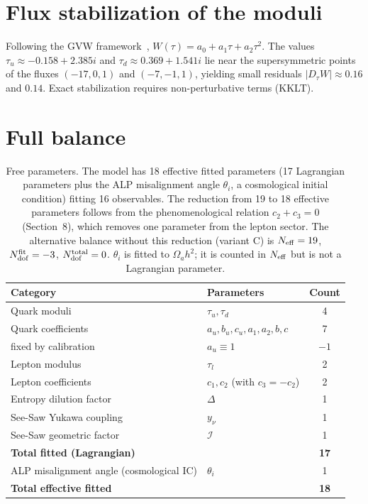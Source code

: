 \documentclass[12pt,a4paper]{article}
\numberwithin{equation}{section}
\begin{document}
\section{Flux stabilization of the moduli}
Following the GVW framework~\cite{GVW2000}, \(W(\tau) = a_0 + a_1 \tau + a_2 \tau^2\). The values \(\tau_u \approx -0.158 + 2.385i\) and \(\tau_d \approx 0.369 + 1.541i\) lie near the supersymmetric points of the fluxes \((-17, 0, 1)\) and \((-7, -1, 1)\), yielding small residuals \(|D_\tau W| \approx 0.16\) and \(0.14\). Exact stabilization requires non-perturbative terms (KKLT).

\section{Full balance}
\begin{table}[H]
\centering
\caption{Free parameters. The model has 18 effective fitted parameters (17 Lagrangian parameters plus the ALP misalignment angle \(\theta_i\), a cosmological initial condition) fitting 16 observables. The reduction from 19 to 18 effective parameters follows from the phenomenological relation \(c_2 + c_3 = 0\) (Section~8), which removes one parameter from the lepton sector. The alternative balance without this reduction (variant C) is \(N_{\rm eff} = 19\), \(N_{\rm dof}^{\rm fit} = -3\), \(N_{\rm dof}^{\rm total} = 0\). \(\theta_i\) is fitted to \(\Omega_a h^2\); it is counted in \(N_{\rm eff}\) but is not a Lagrangian parameter.}
\begin{tabular}{llc}
\toprule
Category & Parameters & Count \\
\midrule
Quark moduli & \(\tau_u, \tau_d\) & 4 \\
Quark coefficients & \(a_u, b_u, c_u, a_1, a_2, b, c\) & 7 \\
\quad fixed by calibration & \(a_u \equiv 1\) & \(-1\) \\
Lepton modulus & \(\tau_l\) & 2 \\
Lepton coefficients & \(c_1, c_2\) (with \(c_3 = -c_2\)) & 2 \\
Entropy dilution factor & \(\Delta\) & 1 \\
See-Saw Yukawa coupling & \(y_\nu\) & 1 \\
See-Saw geometric factor & \(\mathcal{I}\) & 1 \\
\midrule
\textbf{Total fitted (Lagrangian)} & & \textbf{17} \\
\midrule
ALP misalignment angle (cosmological IC) & \(\theta_i\) & 1 \\
\midrule
\textbf{Total effective fitted} & & \textbf{18} \\
\bottomrule
\end{tabular}
\end{table}
\end{document}
